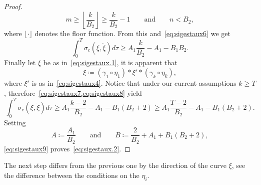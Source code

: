 \documentclass[11pt,a4paper,american]{article}
\begin{document}
\begin{proof}
        \begin{equation*}
            m\ge\left\lfloor\frac k{B_2}\right\rfloor\ge\frac k{B_2}-1\qquad\text{and}\qquad n<B_2,
        \end{equation*}
        where $\lfloor\cdot\rfloor$ denotes the floor function. From this and~\cref{eq:sigestaux6} we get
        \begin{equation}\label{eq:sigestaux7}
            \int_0^T\sigma_c\left(\xi,\dot\xi\right)d\tau\ge A_1\frac k{B_2}-A_1-B_1B_2.
        \end{equation}
        Finally let $\xi$ be as in~\cref{eq:sigestaux.1}, it is apparent that
        \begin{equation}\label{eq:sigestaux8}
            \xi\coloneqq(\gamma_1\circ\eta_1)*\xi'*(\gamma_k\circ\eta_k),
        \end{equation}
        where $\xi'$ is as in~\cref{eq:sigestaux4}. Notice that under our current assumptions $k\ge T$, therefore~\cref{eq:sigestaux7,eq:sigestaux8} yield
        \begin{equation}\label{eq:sigestaux9}
            \int_0^T\sigma_c\left(\xi,\dot\xi\right)d\tau\ge A_1\frac{k-2}{B_2}-A_1-B_1(B_2+2)\ge A_1\frac{T-2}{B_2}-A_1-B_1(B_2+2).
        \end{equation}
        Setting
        \begin{equation*}
            A\coloneqq\frac{A_1}{B_2}\qquad\text{and}\qquad B\coloneqq\frac2{B_2}+A_1+B_1(B_2+2),
        \end{equation*}
        \cref{eq:sigestaux9} proves~\cref{eq:sigestaux.2}.
    \end{proof}

    The next step differs from the previous one by the direction of the curve $\xi$, see the difference between the conditions on the $\eta_i$.
\end{document}
